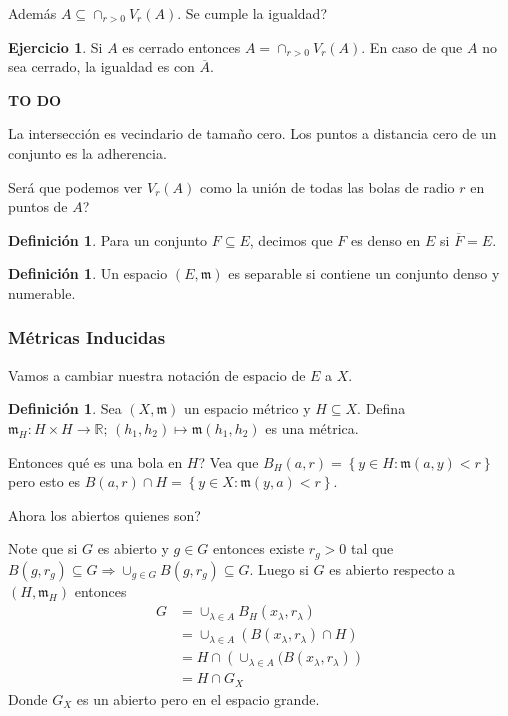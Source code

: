 \documentclass[12pt]{article}
\theoremstyle{plain}
\theoremstyle{definition}
\newtheorem{Def}[Th]{Definición}       %
\newtheorem{Ej}[Th]{Ejercicio}
\theoremstyle{remark}
\numberwithin{equation}{section}
\newcommand{\bR}{\mathbb{R}}        %
\newcommand{\mm}{\mathfrak{m}}      %
\renewcommand{\:}{\colon}           %
\newcommand{\conj}[1]{\left\lbrace#1\right\rbrace}
\begin{document}
\begin{multicols}{2}
Además $A\subseteq\cap_{r>0}V_r(A)$. Se cumple la igualdad?
\begin{Ej}
  Si $A$ es cerrado entonces $A=\cap_{r>0}V_r(A)$. En caso de que $A$ no sea cerrado, la igualdad es con $\overline{A}$.
\end{Ej}

\begin{ptcb}
\textbf{TO DO}\par
La intersección es vecindario de tamaño cero. Los puntos a distancia cero de un conjunto es la adherencia.\par
Será que podemos ver $V_r(A)$ como la unión de todas las bolas de radio $r$ en puntos de $A$?
\end{ptcb}

\begin{Def}
  Para un conjunto $F\subseteq E$, decimos que $F$ es denso en $E$ si $\overline{F}=E$.
\end{Def}

\begin{Def}
  Un espacio $(E,\mm)$ es separable si contiene un conjunto denso y numerable.
\end{Def}

\subsubsection*{Métricas Inducidas}

Vamos a cambiar nuestra notación de espacio de $E$ a $X$.

\begin{Def}
  Sea $(X,\mm)$ un espacio métrico y $H\subseteq X$. Defina $\mm_H\colon H\times H\to\bR;\, (h_1,h_2)\mapsto \mm(h_1,h_2)$ es una métrica.
\end{Def}

Entonces qué es una bola en $H$? Vea que $B_H(a,r)=\conj{y\in H\colon \mm(a,y)<r}$ pero esto es $B(a,r)\cap H=\conj{y\in X\colon \mm(y,a)<r}$.
\par
Ahora los abiertos quienes son?\par
Note que si $G$ es abierto y $g\in G$ entonces existe $r_g>0$ tal que $B(g,r_g)\subseteq G\Rightarrow \cup_{g\in G}B(g,r_g)\subseteq G$. Luego si $G$ es abierto respecto a $(H,\mm_H)$ entonces
\begin{align*}
  G&=\cup_{\lambda\in A}B_H(x_\lambda,r_\lambda) \\
   &=\cup_{\lambda\in A}(B(x_\lambda,r_\lambda)\cap H)\\
   &=H\cap \left(\cup_{\lambda\in A}(B(x_\lambda,r_\lambda)\right)\\
   &= H\cap G_X
\end{align*}
Donde $G_X$ es un abierto pero en el espacio grande.


\end{multicols}
\end{document}
